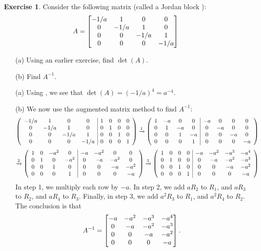 \documentclass[a4paper]{book}
\theoremstyle{definition}
\newtheorem{exercise}[theorem]{Exercise}
\renewenvironment{solution}{\SolutionInline}{\endSolutionInline}
\begin{document}
\begin{exercise}
 Consider the following matrix (called a Jordan block ):
 \[ A = \begin{bmatrix}
          -1/a & 1    & 0    & 0   \\
          0    & -1/a & 1    & 0   \\
          0    & 0    & -1/a & 1   \\
          0    & 0    & 0    & -1/a
        \end{bmatrix}
 \]
 \begin{itemize}
  \item[(a)] Using an earlier exercise, find $\det(A)$.
  \item[(b)] Find $A^{-1}$.
 \end{itemize}
\end{exercise}
\begin{solution}
 \begin{itemize}
  \item[(a)] Using , we see that
   $\det(A)=(-1/a)^4=a^{-4}$.
  \item[(b)] We now use the augmented matrix method to find $A^{-1}$:
  {\tiny \[
   \left(\begin{array}{cccc|cccc}
     -1/a&1&0&0 &1&0&0&0 \\
     0&-1/a&1&0 &0&1&0&0 \\
     0&0&-1/a&1 &0&0&1&0 \\
     0&0&0&-1/a &0&0&0&1
   \end{array}\right) \xrightarrow{1}
   \left(\begin{array}{cccc|cccc}
     1&-a&0&0 &-a&0&0&0 \\
     0&1&-a&0 &0&-a&0&0 \\
     0&0&1&-a &0&0&-a&0 \\
     0&0&0&1  &0&0&0&-a
   \end{array}\right) \] \[ \xrightarrow{2}
   \left(\begin{array}{cccc|cccc}
     1&0&-a^2&0 &-a&-a^2&0&0 \\
     0&1&0&-a^2 &0&-a&-a^2&0 \\
     0&0&1&0    &0&0&-a&-a^2 \\
     0&0&0&1    &0&0&0&-a
   \end{array}\right)  \xrightarrow{3}
   \left(\begin{array}{cccc|cccc}
     1&0&0&0 &-a&-a^2&-a^3&-a^4 \\
     0&1&0&0 &0&-a&-a^2&-a^3 \\
     0&0&1&0 &0&0&-a&-a^2 \\
     0&0&0&1 &0&0&0&-a
   \end{array}\right)
  \]}
  In step 1, we multiply each row by $-a$.  In step 2, we add $aR_2$
  to $R_1$, and $aR_3$ to $R_2$, and $aR_4$ to $R_3$.  Finally, in
  step 3, we add $a^2R_3$ to $R_1$, and $a^2R_4$ to $R_2$.  The
  conclusion is that
  \[ A^{-1} = \begin{bmatrix}
               -a&-a^2&-a^3&-a^4 \\
               0&-a&-a^2&-a^3 \\
               0&0&-a&-a^2 \\
               0&0&0&-a
              \end{bmatrix}.
  \]
 \end{itemize}
\end{solution}
\end{document}
